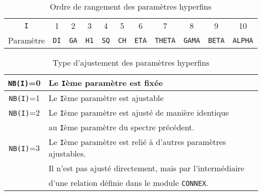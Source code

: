 \begin{table}[!h]
\caption{\label{tab:position_param}Ordre de rangement des paramètres hyperfins}
\begin{tabular}{c|cccccccccc}
\lstinline{I} & 1  &2  & 3 & 4 & 5 & 6 & 7 & 8 & 9 & 10\\
Paramètre & \lstinline{DI} &\lstinline{GA} &\lstinline{H1}&  \lstinline{SQ}&  \lstinline{CH} & \lstinline{ETA}& \lstinline{THETA}&\lstinline{GAMA}& \lstinline{BETA}&\lstinline{ALPHA}
\end{tabular}
\end{table}

 \begin{table}[!h]
 \caption{\label{tab:NB}Type d'ajustement des paramètres hyperfins}
 \begin{tabular}{c|l}
  \lstinline{NB(I)}=0 & Le \lstinline{I}ème paramètre est fixée \\
  \hline
  \lstinline{NB(I)}=1 & Le \lstinline{I}ème paramètre est ajustable \\
  \hline
  \lstinline{NB(I)}=2 & Le \lstinline{I}ème paramètre est ajusté de manière identique \\
    & au \lstinline{I}ème paramètre du spectre précédent. \\
  \hline
  \lstinline{NB(I)}=3 & Le \lstinline{I}ème paramètre est relié à d'autres paramètres ajustables.\\
    & Il n'est pas ajusté directement,  mais par l'intermédiaire\\
    &  d'une relation définie dans le module \lstinline{CONNEX}. 
 \end{tabular}
\end{table}
\FloatBarrier
